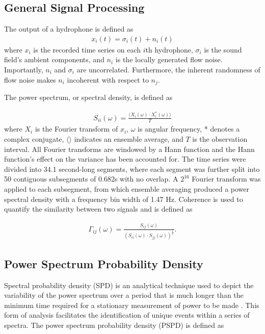 \documentclass[12pt,journal,onecolumn]{IEEEtran}
\begin{document}
\subsection{General Signal Processing}

The output of a hydrophone is defined as
\begin{align}
x_i(t) = \sigma_i(t) + n_i (t) 
\label{output}
\end{align}
where $x_i$ is the recorded time series on each $i$th hydrophone, $\sigma_i$ is the sound field's ambient components, and $n_i$ is the locally generated flow noise. Importantly, $n_i$ and $\sigma_i$ are uncorrelated. 
Furthermore, the inherent randomness of flow noise makes $n_i$ incoherent with  respect to $n_j$. 

The power spectrum, or spectral density, is defined as 

\begin{align}
S_{ii}(\omega) = \frac{\langle X_i(\omega)\cdot X_i^*(\omega) \rangle}{T}
\label{power}
\end{align}
where $X_i$ is the Fourier transform of $x_i$, $\omega$ is angular frequency, * denotes a complex conjugate, $\langle \rangle$ indicates an ensemble average, and $T$ is the observation interval. All Fourier transforms are windowed by a Hann function and the Hann function's effect on the variance has been accounted for. The time series were divided into 34.1 second-long segments, where each segment was further split into 50 contiguous subsegments of 0.682s with no overlap. A $2^{16}$ Fourier transform was applied to each subsegment, from which ensemble averaging produced a power spectral density with a frequency bin width of 1.47 Hz. Coherence is used to quantify the similarity between two signals and is defined as 

\begin{align}
\Gamma_{ij}(\omega) = \frac{S_{ij}(\omega)}{(S_{ii}(\omega) \cdot S_{jj}(\omega))^{\frac{1}{2}}}.
\label{coherence}
\end{align}



\subsection{Power Spectrum Probability Density}

Spectral probability density (SPD) is an analytical technique used to depict the variability of the power spectrum over a period that is much longer than the minimum time required for a stationary measurement of power to be made \cite{merchant}. This form of analysis facilitates the identification of unique events within a series of spectra. The power spectrum probability density (PSPD) is defined as
\end{document}
